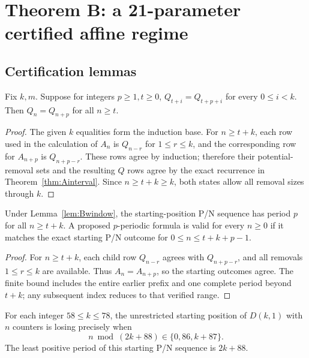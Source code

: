 \section{Theorem B: a 21-parameter certified affine regime}\label{sec:B}
\statusmachine
\subsection{Certification lemmas}
\begin{lemma}\label{lem:Bwindow}
Fix $k,m$. Suppose for integers $p\ge1,t\ge0$,
$Q_{t+i}=Q_{t+p+i}$ for every $0\le i<k$. Then $Q_n=Q_{n+p}$ for all $n\ge t$.
\end{lemma}
\begin{proof}
The given $k$ equalities form the induction base. For $n\ge t+k$, each row used in the calculation of $A_n$ is $Q_{n-r}$ for $1\le r\le k$, and the corresponding row for $A_{n+p}$ is $Q_{n+p-r}$. These rows agree by induction; therefore their potential-removal sets and the resulting $Q$ rows agree by the exact recurrence in Theorem~\ref{thm:Ainterval}. Since $n\ge t+k\ge k$, both states allow all removal sizes through $k$.
\end{proof}
\begin{lemma}\label{lem:Bbridge}
Under Lemma~\ref{lem:Bwindow}, the starting-position P/N sequence has period $p$ for all $n\ge t+k$. A proposed $p$-periodic formula is valid for every $n\ge0$ if it matches the exact starting P/N outcome for $0\le n\le t+k+p-1$.
\end{lemma}
\begin{proof}For $n\ge t+k$, each child row $Q_{n-r}$ agrees with $Q_{n+p-r}$, and all removals $1\le r\le k$ are available. Thus $A_n=A_{n+p}$, so the starting outcomes agree. The finite bound includes the entire earlier prefix and one complete period beyond $t+k$; any subsequent index reduces to that verified range.\end{proof}
\begin{theorem}[Exact certified $A=86$ regime]\label{thm:B}
For each integer $58\le k\le78$, the unrestricted starting position of $D(k,1)$ with $n$ counters is losing precisely when
\[\boxed{n\bmod(2k+88)\in\{0,86,k+87\}.}\]
The least positive period of this starting P/N sequence is $2k+88$.
\end{theorem}
